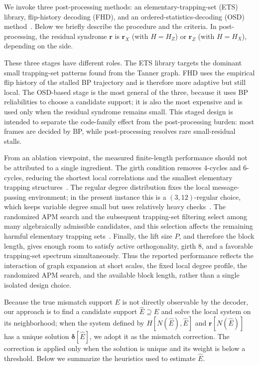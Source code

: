 \documentclass[a4paper,onecolumn,11pt,accepted=2026-08-03]{quantumarticle}
\renewcommand\[{\begin{equation}}
\renewcommand\]{\end{equation}}
\theoremstyle{definition}
\begin{document}
We invoke three post-processing methods:  an elementary-trapping-set (ETS) library, flip-history decoding (FHD), and an ordered-statistics-decoding (OSD) method~\cite{FossorierLin1995}. Below we briefly describe the procedure and the criteria. In post-processing, the residual syndrome $\boldsymbol{r}$ is $\boldsymbol{r}_X$ (with $H=H_Z$) or $\boldsymbol{r}_Z$ (with $H=H_X$), depending on the side.

 {These three stages have different roles.
The ETS library targets the dominant small trapping-set patterns found from the Tanner graph.
FHD uses the empirical flip history of the stalled BP trajectory and is therefore more adaptive but still local.
The OSD-based stage is the most general of the three, because it uses BP reliabilities to choose a candidate support; it is also the most expensive and is used only when the residual syndrome remains small.
This staged design is intended to separate the code-family effect from the post-processing burden: most frames are decided by BP, while post-processing resolves rare small-residual stalls.}

{From an ablation viewpoint, the measured finite-length performance should not be attributed to a single ingredient.
The girth condition removes 4-cycles and 6-cycles, reducing the shortest local correlations and the smallest elementary trapping structures~\cite{Tanner1981,Richardson2003ErrorFloors}.
The regular degree distribution fixes the local message-passing environment; in the present instance this is a $(3,12)$-regular choice, which keeps variable degree small but uses relatively heavy checks~\cite{RichardsonShokrollahiUrbanke2001,RichardsonUrbanke2008}.
The randomized APM search and the subsequent trapping-set filtering select among many algebraically admissible candidates, and this selection affects the remaining harmful elementary trapping sets~\cite{Gholami2015,Auer2002,Richardson2003ErrorFloors}.
Finally, the lift size $P$, and therefore the block length, gives enough room to satisfy active orthogonality, girth 8, and a favorable trapping-set spectrum simultaneously.
Thus the reported performance reflects the interaction of graph expansion at short scales, the fixed local degree profile, the randomized APM search, and the available block length, rather than a single isolated design choice.}

 Because the true mismatch support $E$ is not directly observable by the decoder, our approach is to find a candidate support $\hat{E}\supseteq E$ and solve the local system on its neighborhood; when the system defined by $H[N(\hat{E}),\hat{E}]$ and $\boldsymbol{r}[N(\hat{E})]$ has a unique solution $\boldsymbol{\delta}[\hat{E}]$, we adopt it as the mismatch correction. 
The correction is applied only when the solution is unique and its weight is below a threshold.
Below we summarize the heuristics used to estimate $\hat{E}$.
\end{document}

